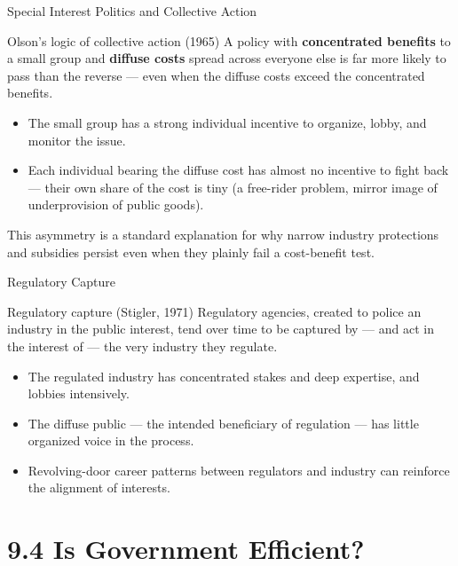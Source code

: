 \documentclass[11pt,aspectratio=169]{beamer}
\begin{document}
\begin{frame}{Special Interest Politics and Collective Action}
  \begin{block}{Olson's logic of collective action (1965)}
    A policy with \textbf{concentrated benefits} to a small group and \textbf{diffuse costs} spread across everyone else is far more likely to pass than the reverse --- even when the diffuse costs exceed the concentrated benefits.
  \end{block}
  \begin{itemize}
    \item The small group has a strong individual incentive to organize, lobby, and monitor the issue.
    \item Each individual bearing the diffuse cost has almost no incentive to fight back --- their own share of the cost is tiny (a free-rider problem, mirror image of underprovision of public goods).
  \end{itemize}
  \small This asymmetry is a standard explanation for why narrow industry protections and subsidies persist even when they plainly fail a cost-benefit test.
\end{frame}

\begin{frame}{Regulatory Capture}
  \begin{block}{Regulatory capture (Stigler, 1971)}
    Regulatory agencies, created to police an industry in the public interest, tend over time to be captured by --- and act in the interest of --- the very industry they regulate.
  \end{block}
  \begin{itemize}
    \item The regulated industry has concentrated stakes and deep expertise, and lobbies intensively.
    \item The diffuse public --- the intended beneficiary of regulation --- has little organized voice in the process.
    \item Revolving-door career patterns between regulators and industry can reinforce the alignment of interests.
  \end{itemize}
\end{frame}

\section{9.4 Is Government Efficient?}
\end{document}
